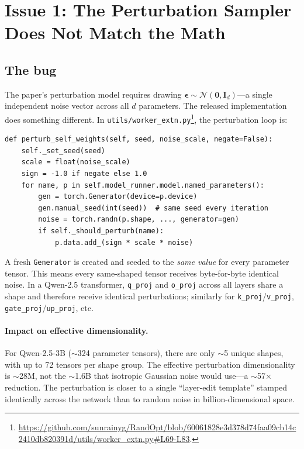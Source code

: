 \documentclass[11pt]{article}
\begin{document}
\section{Issue 1: The Perturbation Sampler Does Not Match the Math}\label{sec:rng}

\subsection{The bug}

The paper's perturbation model requires drawing $\boldsymbol{\epsilon}\sim\mathcal{N}(\mathbf{0},\mathbf{I}_d)$---a single independent noise vector across all $d$ parameters. The released implementation does something different. In \texttt{utils/worker\_extn.py}\footnote{\url{https://github.com/sunrainyg/RandOpt/blob/60061828e3d378d74faa09cb14c2410db820391d/utils/worker_extn.py\#L69-L83}.}, the perturbation loop is:

\begin{lstlisting}
def perturb_self_weights(self, seed, noise_scale, negate=False):
    self._set_seed(seed)
    scale = float(noise_scale)
    sign = -1.0 if negate else 1.0
    for name, p in self.model_runner.model.named_parameters():
        gen = torch.Generator(device=p.device)
        gen.manual_seed(int(seed))  # same seed every iteration
        noise = torch.randn(p.shape, ..., generator=gen)
        if self._should_perturb(name):
            p.data.add_(sign * scale * noise)
\end{lstlisting}

A fresh \texttt{Generator} is created and seeded to the \emph{same value} for every parameter tensor. This means every same-shaped tensor receives byte-for-byte identical noise. In a Qwen-2.5 transformer, \texttt{q\_proj} and \texttt{o\_proj} across all layers share a shape and therefore receive identical perturbations; similarly for \texttt{k\_proj}/\texttt{v\_proj}, \texttt{gate\_proj}/\texttt{up\_proj}, etc.

\paragraph{Impact on effective dimensionality.} For Qwen-2.5-3B ($\sim$324 parameter tensors), there are only $\sim$5 unique shapes, with up to 72 tensors per shape group. The effective perturbation dimensionality is $\sim$28M, not the $\sim$1.6B that isotropic Gaussian noise would use---a $\sim$57$\times$ reduction. The perturbation is closer to a single ``layer-edit template'' stamped identically across the network than to random noise in billion-dimensional space.
\end{document}
